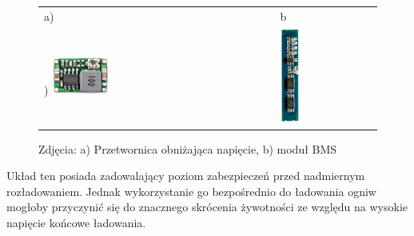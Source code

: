 		\begin{figure}[ht]
			\centering
			\begin{tabular}{@{}lll@{}}
				a) & b \\) %
				\includegraphics[width=0.25\textwidth]{rys02/stepDown.jpg} & 
				\includegraphics[width=0.25\textwidth]{rys02/bms.jpg} \\
			\end{tabular}
			\caption{Zdjęcia: a) Przetwornica obniżająca napięcie, b) moduł BMS}
			\label{fig:przetwirniceIbms}
		\end{figure}
		
		Układ ten posiada zadowalający poziom zabezpieczeń przed nadmiernym rozładowaniem. Jednak wykorzystanie go bezpośrednio do ładowania ogniw mogłoby przyczynić się do znacznego skrócenia żywotności ze względu na wysokie napięcie końcowe ładowania.
		

